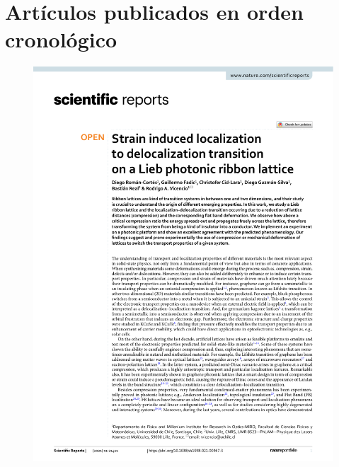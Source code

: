 \section{\qquad Artículos publicados en orden cronológico}
\begin{figure}[H]
	\centering
	\includegraphics[page=1, width=0.9\linewidth]{media/strainlieb.pdf}
\end{figure}
